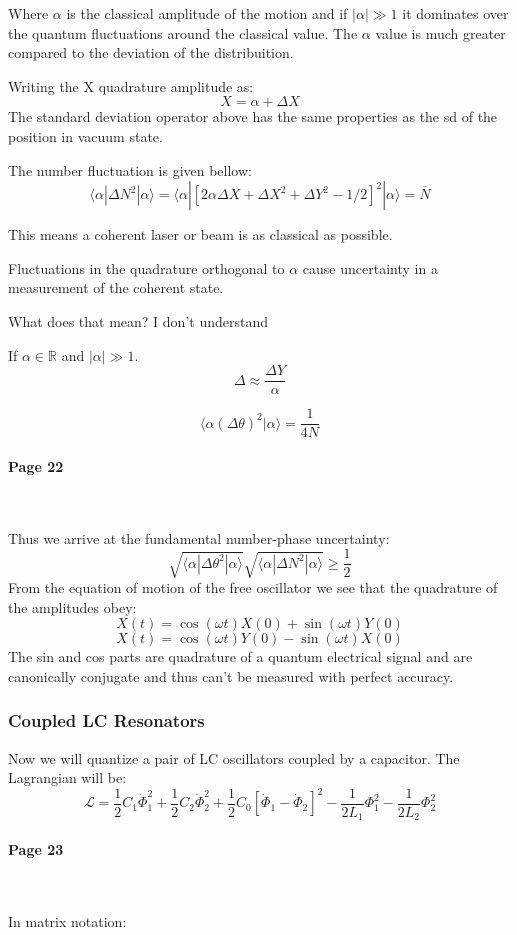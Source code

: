 \documentclass[12pt]{article}
\numberwithin{equation}{subsection}
\newcommand\ask[1]{
{\color{red}
#1
}
}
\newcommand\page[1]{
{
\color{blue}\paragraph{
Page #1
}\mbox{}\\
}
}
\begin{document}
Where $\alpha$ is the classical amplitude of the motion and if $|\alpha|\gg 1$ it dominates over the quantum fluctuations around the classical value. The $\alpha$ value is much greater compared to the deviation of the distribuition.

Writing the X quadrature amplitude as:
\begin{equation}
    X = \alpha + \Delta X
\end{equation}
The standard deviation operator above has the same properties as the sd of the position in vacuum state.

The number fluctuation is given bellow:
\begin{equation}
    \langle \alpha | \Delta N ^2|\alpha \rangle =     \langle \alpha |[2\alpha\Delta X + \Delta X ^2 + \Delta Y ^2 -1/2]^2 |\alpha \rangle = \bar N
\end{equation}

This means a coherent laser or beam is as classical as possible.

Fluctuations in the quadrature orthogonal to $\alpha$ cause uncertainty in a measurement of the coherent state. 
\ask{What does that mean? I don't understand}
If $\alpha \in \mathbb{R}$ and $|\alpha|\gg 1$. 
\begin{equation}
    \Delta \approx \frac{\Delta Y}{\alpha}
\end{equation}

\begin{equation}
\langle \alpha (\Delta \theta)^2|\alpha \rangle = \frac{1}{4N}
\end{equation}

\page{22}
Thus we arrive at the fundamental number-phase uncertainty:
\begin{equation}
\sqrt{     \langle \alpha | \Delta \theta ^2|\alpha\rangle}  \sqrt{     \langle \alpha | \Delta N ^2|\alpha\rangle} \ge  \frac{1}{2}
\end{equation}
From the equation of motion of the free oscillator we see that the quadrature of the amplitudes obey:
\begin{equation}
X(t) = \cos (\omega t) X(0)    +\sin (\omega t) Y(0)
\end{equation}
\begin{equation}
X(t) = \cos (\omega t) Y(0)    -\sin (\omega t) X(0)
\end{equation}
The sin and cos parts are quadrature of a quantum electrical signal and are canonically conjugate and thus can't be measured with perfect accuracy.
\subsubsection{Coupled LC Resonators}
Now we will quantize a pair of LC oscillators coupled by a capacitor. The Lagrangian will be:
\begin{equation}
    \mathcal{L} = \frac{1}{2} C_1\dot\Phi^2_1 +\frac{1}{2} C_2\dot\Phi^2_2+ \frac{1}{2} C_0 [\dot \Phi _1-\dot \Phi _2]^2- \frac{1}{2L_1}\Phi^2_1 - \frac{1}{2L_2}\Phi^2_2
\end{equation}
\page{23}
In matrix notation:
 
\end{document}
